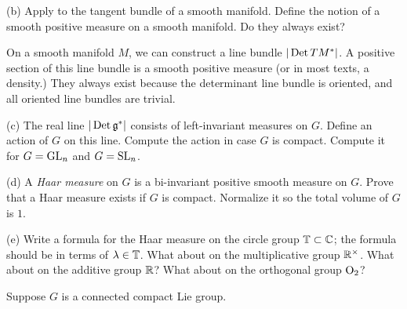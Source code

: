 \documentclass{../../templates/lkx_pset}
\begin{document}
\begin{parts}

	\begin{part}{(b)}
		Apply to the tangent bundle of a smooth manifold. Define the notion of a smooth positive measure on a smooth manifold. Do they always exist?
	\end{part}

	On a smooth manifold $M$, we can construct a line bundle $|\operatorname{Det} TM^*|$. A positive section of this line bundle is a smooth positive measure (or in most texts, a density.) They always exist because the determinant line bundle is oriented, and all oriented line bundles are trivial.

	\begin{part}{(c)}
		The real line $|\operatorname{Det} \mathfrak{g}^*|$ consists of left-invariant measures on $G$. Define an action of $G$ on this line. Compute the action in case $G$ is compact. Compute it for $G = \operatorname{GL}_n$ and $G= \textrm{SL}_n$.
	\end{part}

	\begin{part}{(d)}
		A \emph{Haar measure} on $G$ is a bi-invariant positive smooth measure on $G$. Prove that a Haar measure exists if $G$ is compact. Normalize it so the total volume of $G$ is $1$.
	\end{part}

	\begin{part}{(e)}
		Write a formula for the Haar measure on the circle group $\mathbb{T}\subset \mathbb{C}$; the formula should be in terms of $\lambda\in \mathbb{T}$. What about on the multiplicative group $\mathbb{R}^\times$. What about on the additive group $\mathbb{R}$? What about on the orthogonal group $\operatorname{O}_2$?
	\end{part}
\end{parts}

\begin{problem}{6}
Suppose $G$ is a connected compact Lie group.
\end{problem}
\end{document}
